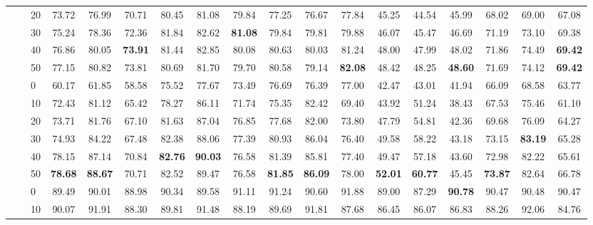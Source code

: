 \begin{table*}[!h]
{\begin{tabular}{lllccc|ccc|ccc|ccc|ccc}
 \textbf{} & \textbf{} & 20 & 73.72 & 76.99 & 70.71 & 80.45 & 81.08 & 79.84 & 77.25 & 76.67 & 77.84 & 45.25 & 44.54 & 45.99 & 68.02 & 69.00 & 67.08 \\ 
 \textbf{} & \textbf{} & 30 & 75.24 & 78.36 & 72.36 & 81.84 & 82.62 & \textbf{81.08} & 79.84 & 79.81 & 79.88 & 46.07 & 45.47 & 46.69 & 71.19 & 73.10 & 69.38 \\ 
 \textbf{} & \textbf{} & 40 & 76.86 & 80.05 & \textbf{73.91} & 81.44 & 82.85 & 80.08 & 80.63 & 80.03 & 81.24 & 48.00 & 47.99 & 48.02 & 71.86 & 74.49 & \textbf{69.42} \\ 
 \textbf{} & \textbf{} & 50 & 77.15 & 80.82 & 73.81 & 80.69 & 81.70 & 79.70 & 80.58 & 79.14 & \textbf{82.08} & 48.42 & 48.25 & \textbf{48.60} & 71.69 & 74.12 & \textbf{69.42} \\ 
 \arrayrulecolor{gray}\cline{2-18}\arrayrulecolor{black}
\textbf{} & \textbf{\multirow{6}{*}{SC}} & 0 & 60.17 & 61.85 & 58.58 & 75.52 & 77.67 & 73.49 & 76.69 & 76.39 & 77.00 & 42.47 & 43.01 & 41.94 & 66.09 & 68.58 & 63.77 \\ 
 \textbf{} & \textbf{} & 10 & 72.43 & 81.12 & 65.42 & 78.27 & 86.11 & 71.74 & 75.35 & 82.42 & 69.40 & 43.92 & 51.24 & 38.43 & 67.53 & 75.46 & 61.10 \\ 
 \textbf{} & \textbf{} & 20 & 73.71 & 81.76 & 67.10 & 81.63 & 87.04 & 76.85 & 77.68 & 82.00 & 73.80 & 47.79 & 54.81 & 42.36 & 69.68 & 76.09 & 64.27 \\ 
 \textbf{} & \textbf{} & 30 & 74.93 & 84.22 & 67.48 & 82.38 & 88.06 & 77.39 & 80.93 & 86.04 & 76.40 & 49.58 & 58.22 & 43.18 & 73.15 & \textbf{83.19} & 65.28 \\ 
 \textbf{} & \textbf{} & 40 & 78.15 & 87.14 & 70.84 & \textbf{82.76} & \textbf{90.03} & 76.58 & 81.39 & 85.81 & 77.40 & 49.47 & 57.18 & 43.60 & 72.98 & 82.22 & 65.61 \\ 
 \textbf{} & \textbf{} & 50 & \textbf{78.68} & \textbf{88.67} & 70.71 & 82.52 & 89.47 & 76.58 & \textbf{81.85} & \textbf{86.09} & 78.00 & \textbf{52.01} & \textbf{60.77} & 45.45 & \textbf{73.87} & 82.64 & 66.78 \\ 
\hline
\arrayrulecolor{gray}\cline{2-18}\arrayrulecolor{black}
\textbf{\multirow{12}{*}{Sentiment Polarity}} & \textbf{\multirow{6}{*}{-}} & 0 & 89.49 & 90.01 & 88.98 & 90.34 & 89.58 & 91.11 & 91.24 & 90.60 & 91.88 & 89.00 & 87.29 & \textbf{90.78} & 90.47 & 90.48 & 90.47 \\ 
 \textbf{} & \textbf{} & 10 & 90.07 & 91.91 & 88.30 & 89.81 & 91.48 & 88.19 & 89.69 & 91.81 & 87.68 & 86.45 & 86.07 & 86.83 & 88.26 & 92.06 & 84.76 \\ 

\end{tabular}}
\end{table*}
